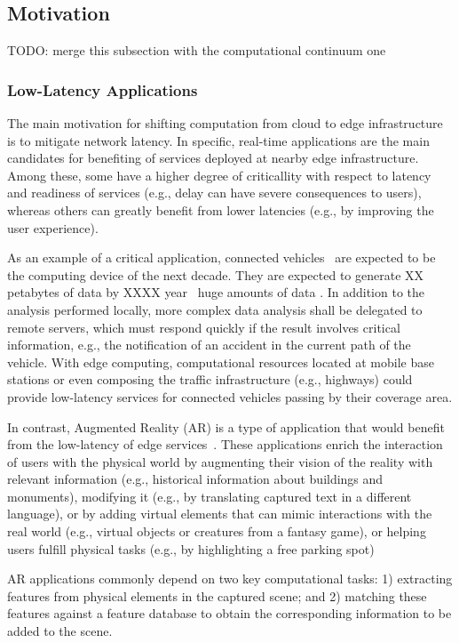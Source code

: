 \subsection{Motivation}

TODO: merge this subsection with the computational continuum one


\subsubsection{Low-Latency Applications}

The main motivation for shifting computation from cloud to edge infrastructure is to mitigate network latency. In specific, real-time applications are the main candidates for benefiting of services deployed at nearby edge infrastructure. Among these, some have a higher degree of criticallity with respect to latency and readiness of services (e.g., delay can have severe consequences to users), whereas others can greatly benefit from lower latencies (e.g., by improving the user experience).

As an example of a critical application, connected vehicles~\cite{} are expected to be the computing device of the next decade. They are expected to generate XX petabytes of data by XXXX year~\cite{connectedCars} huge amounts of data %
. In addition to the analysis performed locally, more complex data analysis shall be delegated to remote servers, which must respond quickly if the result involves critical information, e.g., the notification of an accident in the current path of the vehicle. With edge computing, computational resources located at mobile base stations or even composing the traffic infrastructure (e.g., highways) could provide low-latency services for connected vehicles passing by their coverage area.

In contrast, Augmented Reality (AR) is a type of application that would benefit from the low-latency of edge services~\cite{hu2015mobile}. These applications enrich the interaction of users with the physical
world by augmenting their vision of the reality with relevant information (e.g., historical information about buildings and monuments), modifying it (e.g., by translating captured text in a different language), or by adding virtual elements that can mimic interactions with the real world (e.g., virtual objects or creatures
from a fantasy game), or helping users fulfill physical tasks (e.g., by highlighting a free parking spot) 

AR applications commonly depend on two key computational tasks: 1) extracting features from physical elements in the captured scene; and 2) matching these features against a feature database to obtain the corresponding information to be added to the scene. 

